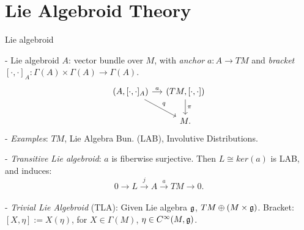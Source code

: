 \section{Lie Algebroid Theory}

\begin{frame}{Lie algebroid}

   - Lie algebroid\cite{Mackenzie2005} $A$: vector bundle over $M$, with \emph{anchor} $a:A \to TM$ and \emph{bracket} $[\cdot, \cdot]_A: \Gamma(A) \times \Gamma(A) \to \Gamma(A)$.
    \begin{equation}
    \begin{tikzcd}[ampersand replacement=\&, column sep=small]
    (A, [\cdot, \cdot]_A) \arrow{r}{a} \arrow{dr}{q} \& (TM, [\cdot, \cdot]) \arrow{d}{\pi}\\
    \& M.
    \end{tikzcd}
    \end{equation}
    - \textit{Examples}: $TM$, Lie Algebra Bun. (LAB), Involutive Distributions.
    
    - \emph{Transitive Lie algebroid}: $a$ is fiberwise surjective. Then $L \cong ker(a)$ is LAB, and induces:
    \begin{equation*}
        0 \to L \xrightarrow{j} A \xrightarrow{a} TM \to 0.
    \end{equation*}
    \\
    - \emph{Trivial Lie Algebroid} (TLA): Given Lie algebra $\mathfrak{g}$, $TM \oplus (M \times \mathfrak{g})$. Bracket: $[X, \eta] := X(\eta)$, for $X \in \Gamma(M)$, $\eta \in C^\infty(M, \mathfrak{g})$.
    
\end{frame}



